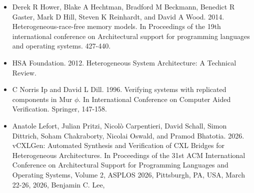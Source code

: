 \documentclass[10pt]{article}
\begin{document}
\begin{itemize}
  \item[] [19] Derek R Hower, Blake A Hechtman, Bradford M Beckmann, Benedict R Gaster, Mark D Hill, Steven K Reinhardt, and David A Wood. 2014. Heterogeneous-race-free memory models. In Proceedings of the 19th international conference on Architectural support for programming languages and operating systems. 427-440.
  \item[] [20] HSA Foundation. 2012. Heterogeneous System Architecture: A Technical Review.
  \item[] [21] C Norris Ip and David L Dill. 1996. Verifying systems with replicated components in Mur $\phi$. In International Conference on Computer Aided Verification. Springer, 147-158.
  \item[] [22] Anatole Lefort, Julian Pritzi, Nicolò Carpentieri, David Schall, Simon Dittrich, Soham Chakraborty, Nicolai Oswald, and Pramod Bhatotia. 2026. vCXLGen: Automated Synthesis and Verification of CXL Bridges for Heterogeneous Architectures. In Proceedings of the 31st ACM International Conference on Architectural Support for Programming Languages and Operating Systems, Volume 2, ASPLOS 2026, Pittsburgh, PA, USA, March 22-26, 2026, Benjamin C. Lee,
\end{itemize}
\end{document}

